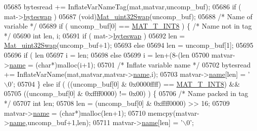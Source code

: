 \begin{DoxyCode}
{{{{{{{{{{{{{{{{{{{{{{{{{{{{{{{{{{05685                 bytesread += InflateVarNameTag(mat,matvar,uncomp\_buf);
05686                 \textcolor{keywordflow}{if} ( mat->\hyperlink{struct__mat__t_a99d207977af5e04941ace56d71817a40}{byteswap} )
05687                     (void)\hyperlink{endian_8c_a8cb0d0750e2eaf9840d95db531934f4f}{Mat\_uint32Swap}(uncomp\_buf);
05688                 \textcolor{comment}{/* Name of variable */}
05689                 \textcolor{keywordflow}{if} ( uncomp\_buf[0] == \hyperlink{group___m_a_t_ggacf7b3b879282b7ab3a51190e49bf3453a9807f5033ed4f9b548953742d9fd1658}{MAT\_T\_INT8} ) \{    \textcolor{comment}{/* Name not in tag */}
05690                     \textcolor{keywordtype}{int} len, i;
05691                     \textcolor{keywordflow}{if} ( mat->\hyperlink{struct__mat__t_a99d207977af5e04941ace56d71817a40}{byteswap} )
05692                         len = \hyperlink{endian_8c_a8cb0d0750e2eaf9840d95db531934f4f}{Mat\_uint32Swap}(uncomp\_buf+1);
05693                     \textcolor{keywordflow}{else}
05694                         len = uncomp\_buf[1];
05695 
05696                     \textcolor{keywordflow}{if} ( len %
05697                         i = len;
05698                     \textcolor{keywordflow}{else}
05699                         i = len+(8-(len %
05700                     matvar->\hyperlink{group___m_a_t_a5d4b55b041e3b4fb50c04337f05ad909}{name} = (\textcolor{keywordtype}{char}*)malloc(i+1);
05701                     \textcolor{comment}{/* Inflate variable name */}
05702                     bytesread += InflateVarName(mat,matvar,matvar->\hyperlink{group___m_a_t_a5d4b55b041e3b4fb50c04337f05ad909}{name},i);
05703                     matvar->\hyperlink{group___m_a_t_a5d4b55b041e3b4fb50c04337f05ad909}{name}[len] = \textcolor{charliteral}{'\(\backslash\)0'};
05704                 \} \textcolor{keywordflow}{else} \textcolor{keywordflow}{if} ( ((uncomp\_buf[0] & 0x0000ffff) == \hyperlink{group___m_a_t_ggacf7b3b879282b7ab3a51190e49bf3453a9807f5033ed4f9b548953742d9fd1658}{MAT\_T\_INT8}) &&
05705                             ((uncomp\_buf[0] & 0xffff0000) != 0x00) ) \{
05706                     \textcolor{comment}{/* Name packed in tag */}
05707                     \textcolor{keywordtype}{int} len;
05708                     len = (uncomp\_buf[0] & 0xffff0000) >> 16;
05709                     matvar->\hyperlink{group___m_a_t_a5d4b55b041e3b4fb50c04337f05ad909}{name} = (\textcolor{keywordtype}{char}*)malloc(len+1);
05710                     memcpy(matvar->\hyperlink{group___m_a_t_a5d4b55b041e3b4fb50c04337f05ad909}{name},uncomp\_buf+1,len);
05711                     matvar->\hyperlink{group___m_a_t_a5d4b55b041e3b4fb50c04337f05ad909}{name}[len] = \textcolor{charliteral}{'\(\backslash\)0'};
}}}}}}}}}}}}}}}}}}}}}}}}}}}}}}}}}}
\end{DoxyCode}
